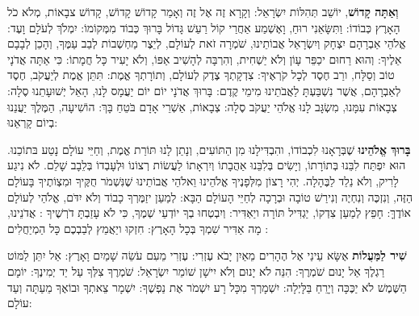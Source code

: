 \textbf{וְאַתָּה קָדוֹשׁ}, יוֹשֵׁב תְּהִלּוֹת יִשְׂרָאֵל: וְקָרָא זֶה אֶל זֶה וְאָמַר קָדוֹשׁ קָדוֹשׁ, קָדוֹשׁ \Shem{} צבָאוֹת, מְלֹא כֹל הָאָרֶץ כְּבוֹדוֹ:  וַתִּשָּׂאֵנִי רוּחַ, וָאֶשְׁמַע אַחֲרַי קוֹל רַעַשׁ גָּדוֹל בָּרוּךְ כְּבוֹד \Shem{} מִמְּקוֹמוֹ:  \Shem{} יִמְלֹךְ לְעֹלָם וָעֶד:  \Shem{} אֱלֹהֵי אַבְרָהָם יִצְחָק וְיִשְׂרָאֵל אֲבוֹתֵינוּ, שֹׁמְרָה זֹאת לְעוֹלָם, לְיֵצֶר מַחְשְׁבוֹת לְבַב עַמֶּךָ, וְהָכֵן לְבָבָם אֵלֶיךָ: וְהוּא רַחוּם יכַפֵּר עָוֹן וְלֹא יַשְׁחִית, וְהִרְבָּה לְהָשִׁיב אַפּוֹ, וְלֹא יָעִיר כָּל חֲמָתוֹ: כִּי אַתָּה אֲדֹנָי טוֹב וְסַלָּח, ורַב חֶסֶד לְכָל קֹרְאֶיךָ: צִדְקָתְךָ צֶדֶק לְעוֹלָם, וְתוֹרָתְךָ אֱמֶת: תִּתֵּן אֱמֶת לְיַעֲקֹב, חֶסֶד לְאַבְרָהָם, אֲשֶׁר נִשְׁבַּעְתָּ לַאֲבֹתֵינוּ מִימֵי קֶדֶם: בָּרוּךְ אֲדֹנָי יוֹם יוֹם יַעֲמָס לָנוּ, הָאֵל יְשׁוּעָתֵנוּ סֶלָה: \Shem{} צְבָאוֹת עִמָּנוּ, מִשְׂגָּב לָנוּ אֱלֹהֵי יַעֲקֹב סֶלָה: \Shem{} צְבָאוֹת, אַשְׁרֵי אָדָם בֹּטֵחַ בָּךְ: \Shem{} הוֹשִׁיעָה, הַמֶּלֶךְ יַעֲנֵנוּ בְיוֹם קָרְאֵנוּ:

\textbf{בָּרוּךְ אֱלֹהֵינוּ} שֶׁבְּרָאָנוּ לִכְבוֹדוֹ, והִבְדִּילָנוּ מִן הַתּוֹעִים, וְנָתַן לָנוּ תּוֹרַת אֱמֶת, וְחַיֵּי עוֹלָם נָטַע בּתוֹכֵנוּ. הוּא יִפְתַּח לִבֵּנוּ בְּתוֹרָתוֹ, וְיָשִׂים בְּלִבֵּנוּ אַהֲבָתוֹ וְיִרְאָתוֹ לַעֲשׂוֹת רְצוֹנוֹ וּלְעָבְדוֹ בְּלֵבָב שָׁלֵם. לֹא נִיגַע לָרִיק, וְלֹא נֵלֵד לַבֶּהָלָה. יְהִי רָצוֹן מִלְּפָנֶיךָ \Shem{} אֱלֹהֵינוּ וֵאלֹהֵי אֲבוֹתֵינוּ שֶׁנִּשְׁמֹר חֻקֶּיךָ וּמִצְוֹתֶיךָ בָּעוֹלָם הַזֶּה, וְנִזְכֶּה וְנִחְיֶה וְנִירַשׁ טוֹבָה וּבְרָכָה לְחַיֵּי הָעוֹלָם הַבָּא: לְמַעַן יזַמֶּרְךָ כָבוֹד וְלֹא יִדֹּם, \Shem{} אֱלֹהַי לְעוֹלָם אוֹדֶךָּ: \Shem{} חָפֵץ לְמַעַן צִדְקוֹ, יַגְדִּיל תּוֹרָה ויַאְדִּיר: וְיִבְטְחוּ בְךָ יוֹדְעֵי שְׁמֶךָ, כִּי לֹא עָזַבְתָּ דֹרְשֶׁיךָ \Shem{}: \Shem{} אֲדֹנֵינוּ, מָה אַדִּיר שִׁמְךָ בְּכָל הָאָרֶץ: חִזְקוּ ויַאֲמֵץ לְבַבְכֶם כָּל הַמְיַחֲלִים :



\textbf{שִׁיר לַמַּעֲלוֹת} אֶשָּׂא עֵינַי אֶל הֶהָרִים מֵאַיִן יָבֹא עֶזְרִי: עֶזְרִי מֵעִם \Shem{} עֹשֵׂה שָׁמַיִם וָאָרֶץ: אַל יִתֵּן לַמּוֹט רַגְלֶךָ אַל יָנוּם שֹׁמְרֶךָ: הִנֵּה לֹא יָנוּם וְלֹא יִישָׁן שׁוֹמֵר יִשְׂרָאֵל: \Shem{} שֹׁמְרֶךָ \Shem{} צִלְּךָ עַל יַד יְמִינֶךָ: יוֹמָם הַשֶּׁמֶשׁ לֹא יַכֶּכָּה וְיָרֵחַ בַּלָּיְלָה: \Shem{} יִשְׁמָרְךָ מִכָּל רָע יִשְׁמֹר אֶת נַפְשֶׁךָ: \Shem{} יִשְׁמָר צֵאתְךָ וּבוֹאֶךָ מֵעַתָּה וְעַד עוֹלָם:

